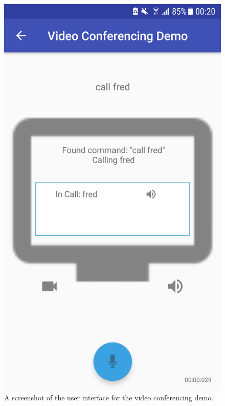 \documentclass[11pt]{article}
\begin{document}
\begin{center}
\begin{figure}
\begin{center}
  \includegraphics[scale=0.3]{snapshot-calling.png}
  \caption{A screenshot of the user interface for the video conferencing demo.}
  \label{fig:snapshot-calling}
  \end{center}
\end{figure}
\end{center}
\end{document}
